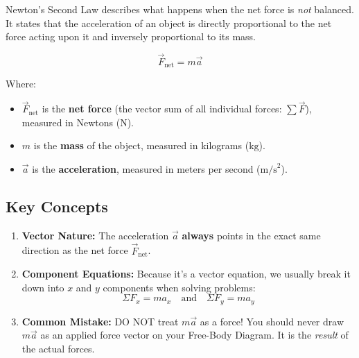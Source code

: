 \documentclass{article}
\begin{document}
Newton's Second Law describes what happens when the net force is \emph{not} balanced. It states that the acceleration of an object is directly proportional to the net force acting upon it and inversely proportional to its mass.

\begin{equation}
\vec{F}_{\text{net}} = m\vec{a}
\end{equation}

Where:
\begin{itemize}
    \item $\vec{F}_{\text{net}}$ is the \textbf{net force} (the vector sum of all individual forces: $\sum \vec{F}$), measured in Newtons ($\text{N}$).
    \item $m$ is the \textbf{mass} of the object, measured in kilograms ($\text{kg}$).
    \item $\vec{a}$ is the \textbf{acceleration}, measured in meters per second ($\text{m/s}^2$).
\end{itemize}

\subsection{Key Concepts}
\begin{enumerate}
    \item \textbf{Vector Nature:} The acceleration $\vec{a}$ \textbf{always} points in the exact same direction as the net force $\vec{F}_{\text{net}}$.
    \item \textbf{Component Equations:} Because it's a vector equation, we usually break it down into $x$ and $y$ components when solving problems:
    \begin{equation*}
        \Sigma F_x = m a_x \quad \text{and} \quad \Sigma F_y = m a_y
    \end{equation*}
    \item \textbf{Common Mistake:} DO NOT treat $m\vec{a}$ as a force! You should never draw $m\vec{a}$ as an applied force vector on your Free-Body Diagram. It is the \emph{result} of the actual forces.
\end{enumerate}
\end{document}

